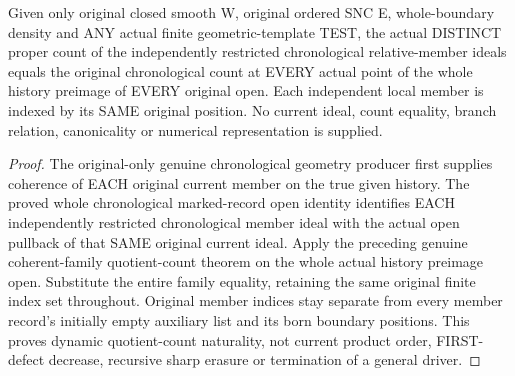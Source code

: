 \begin{theorem}
\label{hir:sharp-original-chronological-distinct-count-open}
\leanok
Given only original closed smooth W, original ordered SNC E, whole-boundary
density and ANY actual finite geometric-template TEST, the actual DISTINCT
proper count of the independently restricted chronological relative-member
ideals equals the original chronological count at EVERY actual point of the
whole history preimage of EVERY original open. Each independent local member
is indexed by its SAME original position. No current ideal, count equality,
branch relation, canonicality or numerical representation is supplied.
\end{theorem}
\begin{proof}
The original-only genuine chronological geometry producer first supplies
coherence of EACH original current member on the true given history. The
proved whole chronological marked-record open identity identifies EACH
independently restricted chronological member ideal with the actual open
pullback of that SAME original current ideal. Apply the preceding genuine
coherent-family quotient-count theorem on the whole actual history preimage
open. Substitute the entire family equality, retaining the same original
finite index set throughout. Original member indices stay separate from every
member record's initially empty auxiliary list and its born boundary positions.
This proves dynamic quotient-count naturality, not current product order,
FIRST-defect decrease, recursive sharp erasure or termination of a general driver.
\end{proof}

